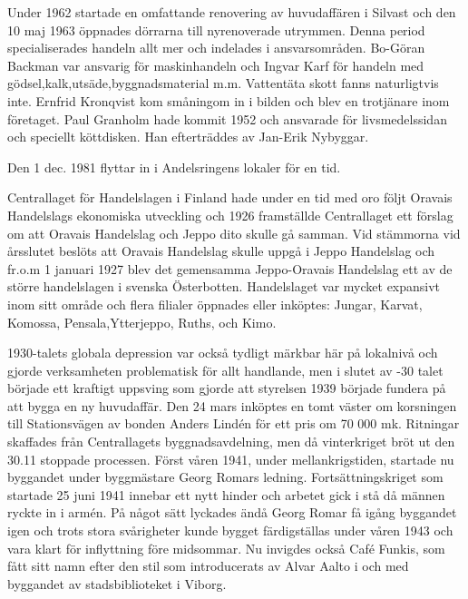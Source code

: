 Under 1962 startade en omfattande renovering av huvudaffären i Silvast och den 10 maj 1963 öppnades dörrarna till nyrenoverade utrymmen. Denna period specialiserades handeln allt mer och indelades i ansvarsområden. Bo-Göran Backman var ansvarig för maskinhandeln och Ingvar Karf för handeln med gödsel,kalk,utsäde,byggnadsmaterial m.m. Vattentäta skott fanns naturligtvis inte. Ernfrid Kronqvist kom småningom in i bilden och blev en trotjänare inom företaget. Paul Granholm hade kommit 1952 och ansvarade för livsmedelssidan och speciellt köttdisken. Han efterträddes av Jan-Erik Nybyggar.

Den 1 dec. 1981 flyttar  in i Andelsringens lokaler för en tid.


Centrallaget för Handelslagen i Finland hade under en tid med oro följt Oravais Handelslags ekonomiska utveckling och 1926 framställde Centrallaget ett förslag om att Oravais Handelslag och Jeppo dito skulle gå samman. Vid stämmorna vid årsslutet beslöts att Oravais Handelslag skulle uppgå i Jeppo Handelslag och fr.o.m 1 januari 1927 blev det gemensamma Jeppo-Oravais Handelslag ett av de större handelslagen i svenska Österbotten. Handelslaget var mycket expansivt inom sitt område och flera filialer öppnades eller inköptes: Jungar, Karvat, Komossa, Pensala,Ytterjeppo, Ruths, och Kimo.

1930-talets globala depression var också tydligt märkbar här på lokalnivå och gjorde verksamheten problematisk för allt handlande, men i slutet av -30 talet började ett kraftigt uppsving som gjorde att styrelsen 1939 började fundera på att bygga en ny huvudaffär. Den 24 mars inköptes en tomt väster om korsningen till Stationsvägen av bonden Anders Lindén för ett pris om 70 000 mk. Ritningar skaffades från Centrallagets byggnadsavdelning, men då vinterkriget bröt ut den 30.11 stoppade processen. Först våren 1941, under mellankrigstiden, startade nu byggandet under byggmästare Georg Romars ledning. Fortsättningskriget som startade 25 juni 1941 innebar ett nytt hinder och arbetet gick i stå då männen ryckte in i armén. På något sätt lyckades ändå Georg Romar få igång byggandet igen och trots stora svårigheter  kunde bygget färdigställas under våren 1943 och vara klart för inflyttning före midsommar. Nu invigdes också Café Funkis, som fått sitt namn efter den stil som introducerats av Alvar Aalto i och med byggandet av stadsbiblioteket i Viborg.

